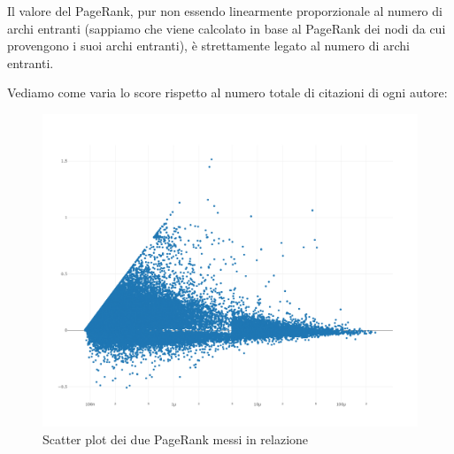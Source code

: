 \documentclass[a4paper, 12pt]{article}
\begin{document}
Il valore del PageRank, pur non essendo linearmente proporzionale al numero di archi entranti (sappiamo che viene calcolato in base al PageRank dei nodi da cui provengono i suoi archi entranti), è strettamente legato al numero di archi entranti.
\par Vediamo come varia lo score rispetto al numero totale di citazioni di ogni autore:
\begin{figure}[H]
  \includegraphics[width=\linewidth]{images/grafico-3.png}
  \caption{Scatter plot dei due PageRank messi in relazione}
\end{figure}

\medskip
 


\end{document}
